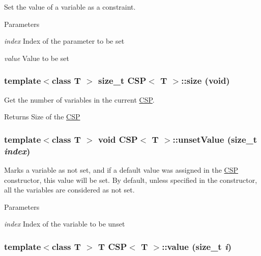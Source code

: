 Set the value of a variable as a constraint. 


\begin{DoxyParams}{Parameters}
\item[{\em index}]Index of the parameter to be set \item[{\em value}]Value to be set \end{DoxyParams}
\hypertarget{classCSP_a125c7171c19b99e631926bbe011f127d}{
\subsubsection[{size}]{\setlength{\rightskip}{0pt plus 5cm}template$<$class T $>$ size\_\-t {\bf CSP}$<$ T $>$::size (void)}}
\label{classCSP_a125c7171c19b99e631926bbe011f127d}


Get the number of variables in the current \hyperlink{classCSP}{CSP}. 

\begin{DoxyReturn}{Returns}
Size of the \hyperlink{classCSP}{CSP} 
\end{DoxyReturn}
\hypertarget{classCSP_a4c0cae125a610f519dc22eaec255a0ae}{
\subsubsection[{unsetValue}]{\setlength{\rightskip}{0pt plus 5cm}template$<$class T $>$ void {\bf CSP}$<$ T $>$::unsetValue (size\_\-t {\em index})}}
\label{classCSP_a4c0cae125a610f519dc22eaec255a0ae}


Marks a variable as not set, and if a default value was assigned in the \hyperlink{classCSP}{CSP} constructor, this value will be set. By default, unless specified in the constructor, all the variables are considered as not set. 


\begin{DoxyParams}{Parameters}
\item[{\em index}]Index of the variable to be unset \end{DoxyParams}
\hypertarget{classCSP_aafa5e1a65d6c5d80780437d8d684f32a}{
\subsubsection[{value}]{\setlength{\rightskip}{0pt plus 5cm}template$<$class T $>$ T {\bf CSP}$<$ T $>$::value (size\_\-t {\em i})}}
\label{classCSP_aafa5e1a65d6c5d80780437d8d684f32a}


